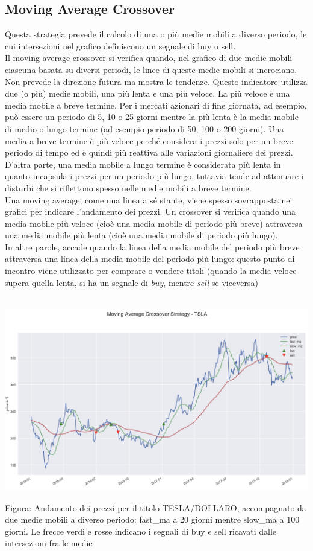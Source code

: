 \documentclass[a4paper,12pt]{report}
\begin{document}
\subsection{Moving Average Crossover}
Questa strategia prevede il calcolo di una o più medie mobili a diverso periodo, le cui intersezioni nel grafico definiscono un segnale di buy o sell.\\
Il moving average crossover si verifica quando, nel grafico di due medie mobili ciascuna basata su diversi periodi, le linee di queste medie mobili si incrociano. Non prevede la direzione futura ma mostra le tendenze. Questo indicatore utilizza due (o più) medie mobili, una più lenta e una più veloce. La più veloce è una media mobile a breve termine. Per i mercati azionari di fine giornata, ad esempio, può essere un periodo di 5, 10 o 25 giorni mentre la più lenta è la media mobile di medio o lungo termine (ad esempio periodo di 50, 100 o 200 giorni). Una media a breve termine è più veloce perché considera i prezzi solo per un breve periodo di tempo ed è quindi più reattiva alle variazioni giornaliere dei prezzi. D'altra parte, una media mobile a lungo termine è considerata più lenta in quanto incapsula i prezzi per un periodo più lungo, tuttavia tende ad attenuare i disturbi che si riflettono spesso nelle medie mobili a breve termine.
\\
Una moving average, come una linea a sé stante, viene spesso sovrapposta nei grafici per indicare l'andamento dei prezzi. Un crossover si verifica quando una media mobile più veloce (cioè una media mobile di periodo più breve) attraversa una media mobile più lenta (cioè una media mobile di periodo più lungo).\\
In altre parole, accade quando la linea della media mobile del periodo più breve attraversa una linea della media mobile del periodo più lungo: questo punto di incontro viene utilizzato per comprare o vendere titoli (quando la media veloce supera quella lenta, si ha un segnale di \textit{buy}, mentre \textit{sell} se viceversa)
\\~\\
\begin{fig}
	\includegraphics[width=\linewidth]{moving_avg}
	\caption{Figura: Andamento dei prezzi per il titolo TESLA/DOLLARO, accompagnato da due medie mobili a diverso periodo: fast\_ma a 20 giorni mentre slow\_ma a 100 giorni. Le frecce verdi e rosse indicano i segnali di buy e sell ricavati dalle intersezioni fra le medie}
\end{fig}
\end{document}
